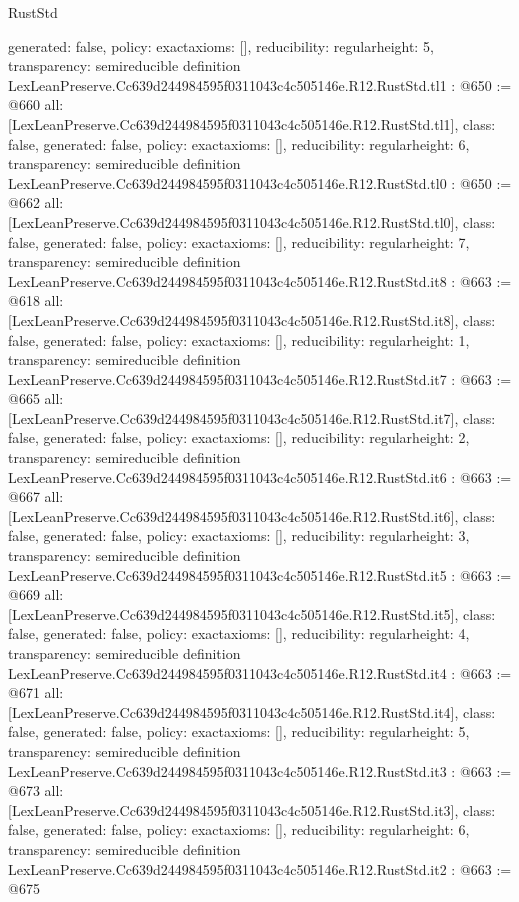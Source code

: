 \begin{lexlean}{RustStd}
\begin{coremodule}
{  generated: false,
  policy: exact{axioms: []},
  reducibility: regular{height: 5},
  transparency: semireducible
}
definition LexLeanPreserve.Cc639d244984595f0311043c4c505146e.R12.RustStd.tl1 : @650 := @660 {
  all: [LexLeanPreserve.Cc639d244984595f0311043c4c505146e.R12.RustStd.tl1],
  class: false,
  generated: false,
  policy: exact{axioms: []},
  reducibility: regular{height: 6},
  transparency: semireducible
}
definition LexLeanPreserve.Cc639d244984595f0311043c4c505146e.R12.RustStd.tl0 : @650 := @662 {
  all: [LexLeanPreserve.Cc639d244984595f0311043c4c505146e.R12.RustStd.tl0],
  class: false,
  generated: false,
  policy: exact{axioms: []},
  reducibility: regular{height: 7},
  transparency: semireducible
}
definition LexLeanPreserve.Cc639d244984595f0311043c4c505146e.R12.RustStd.it8 : @663 := @618 {
  all: [LexLeanPreserve.Cc639d244984595f0311043c4c505146e.R12.RustStd.it8],
  class: false,
  generated: false,
  policy: exact{axioms: []},
  reducibility: regular{height: 1},
  transparency: semireducible
}
definition LexLeanPreserve.Cc639d244984595f0311043c4c505146e.R12.RustStd.it7 : @663 := @665 {
  all: [LexLeanPreserve.Cc639d244984595f0311043c4c505146e.R12.RustStd.it7],
  class: false,
  generated: false,
  policy: exact{axioms: []},
  reducibility: regular{height: 2},
  transparency: semireducible
}
definition LexLeanPreserve.Cc639d244984595f0311043c4c505146e.R12.RustStd.it6 : @663 := @667 {
  all: [LexLeanPreserve.Cc639d244984595f0311043c4c505146e.R12.RustStd.it6],
  class: false,
  generated: false,
  policy: exact{axioms: []},
  reducibility: regular{height: 3},
  transparency: semireducible
}
definition LexLeanPreserve.Cc639d244984595f0311043c4c505146e.R12.RustStd.it5 : @663 := @669 {
  all: [LexLeanPreserve.Cc639d244984595f0311043c4c505146e.R12.RustStd.it5],
  class: false,
  generated: false,
  policy: exact{axioms: []},
  reducibility: regular{height: 4},
  transparency: semireducible
}
definition LexLeanPreserve.Cc639d244984595f0311043c4c505146e.R12.RustStd.it4 : @663 := @671 {
  all: [LexLeanPreserve.Cc639d244984595f0311043c4c505146e.R12.RustStd.it4],
  class: false,
  generated: false,
  policy: exact{axioms: []},
  reducibility: regular{height: 5},
  transparency: semireducible
}
definition LexLeanPreserve.Cc639d244984595f0311043c4c505146e.R12.RustStd.it3 : @663 := @673 {
  all: [LexLeanPreserve.Cc639d244984595f0311043c4c505146e.R12.RustStd.it3],
  class: false,
  generated: false,
  policy: exact{axioms: []},
  reducibility: regular{height: 6},
  transparency: semireducible
}
definition LexLeanPreserve.Cc639d244984595f0311043c4c505146e.R12.RustStd.it2 : @663 := @675 {
}
\end{coremodule}
\end{lexlean}
